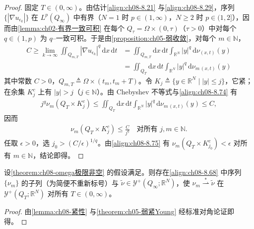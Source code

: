 \documentclass[../../main.tex]{subfiles}%
\begin{document}
\begin{proof}
固定 $T\in(0,\infty)$。由估计\eqref{align:ch08-8.21} 与\eqref{align:ch08-8.29}，序列 $\{|\nabla u_{\epsilon_k}|\}$ 在 $L^p(Q_\infty)$ 中有界（$N=1$ 时 $p\in(1,\infty)$，$N\geqslant2$ 时 $p\in(1,2]$），因而由\cref{lemma:ch02-有界一致可积} 在每个 $Q_\tau=\Omega\times(0,\tau)$（$\tau>0$）中对每个 $q\in(1,p)$ 为 $q$--一致可积。于是由\cref{proposition:ch05-弱收敛}，对每个 $m\in\mathbb{N}$，
\begin{align}
C\geqslant\lim_{k\to\infty}\iint_{Q_{m,T}}|\nabla u_{\epsilon_k}|^q\,\mathrm{d}x\,\mathrm{d}t
&=\iint_{Q_{m,T}}\mathrm{d}x\,\mathrm{d}t\int_{\mathbb{R}^N}|y|^q\,\mathrm{d}\nu_{(x,t)}(y)\nonumber\\
&=\iint_{Q_T}\mathrm{d}x\,\mathrm{d}t\int_{\mathbb{R}^N}|y|^q\,\mathrm{d}\nu_{m\,(x,t)}(y) \label{align:ch08-8.74}
\end{align}
其中常数 $C>0$，$Q_{m,T}\triangleq \Omega\times(t_m,t_m+T)$。令 $K_j\triangleq \{y\in\mathbb{R}^N\mid|y|\leqslant j\}$，它紧；在余集 $K_j^c$ 上有 $|y|>j$（$j\in\mathbb{N}$）。由 Chebyshev 不等式与\eqref{align:ch08-8.74} 有
\begin{align*}
j^q\nu_m(Q_T\times K_j^c)\leqslant\iint_{Q_T}\mathrm{d}x\,\mathrm{d}t\int_{\mathbb{R}^N}|y|^q\,\mathrm{d}\nu_{m\,(x,t)}(y)\leqslant C,
\end{align*}
因而
\begin{align}
\nu_m(Q_T\times K_j^c)\leqslant\frac{C}{j^q}\quad\text{对所有 }j,m\in\mathbb{N}. \label{align:ch08-8.75}
\end{align}
任取 $\epsilon>0$，选 $j_0>(C/\epsilon)^{1/q}$。由\eqref{align:ch08-8.75} 有 $\nu_m(Q_T\times K_{j_0}^c)<\epsilon$ 对所有 $m\in\mathbb{N}$，结论即得。
\end{proof}

\begin{lemma}\label{lemma:ch08-ν_m收敛}
设\cref{theorem:ch08-omega极限非空} 的假设满足。则存在\eqref{align:ch08-8.68} 中序列 $\{\nu_m\}$ 的子列（为简便不重新标号）与 $\tilde\nu\in\mathcal{Y}^+(Q_\infty;\mathbb{R}^N)$，使 $\nu_m\stackrel{*}{\rightharpoonup}\tilde\nu$ 在 $\mathcal{Y}^+(Q_T;\mathbb{R}^N)$ 对所有 $T\in(0,\infty)$。
\end{lemma}

\begin{proof}
由\cref{lemma:ch08-紧性} 与\cref{theorem:ch05-弱紧Young} 经标准对角论证即得。
\end{proof}
\end{document}
